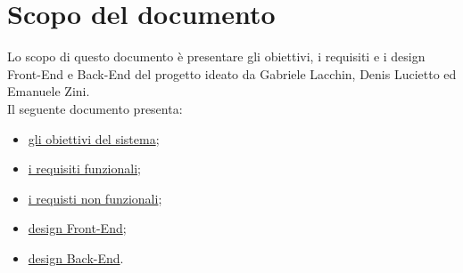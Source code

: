 \section*{Scopo del documento}
Lo scopo di questo documento è presentare gli obiettivi, i requisiti e i design Front-End e Back-End del progetto \nome ideato da Gabriele Lacchin, Denis Lucietto ed Emanuele Zini.\\
Il seguente documento presenta:
\begin{itemize}
    \item \hyperref[secD1:ObiettiviDelProgetto]{gli obiettivi del sistema};
    \item \hyperref[secD1:RequisitiFunzionali]{i requisiti funzionali};
    \item \hyperref[secD1:RequisitiNonFunzionali]{i requisti non funzionali};
    \item \hyperref[secD1:RequisitiFrontEnd]{design Front-End};
    \item \hyperref[secD1:RequisitiBackEnd]{design Back-End}.
\end{itemize}